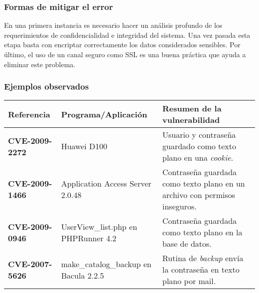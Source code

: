 \subsubsection{Formas de mitigar el error}

En una primera instancia es necesario hacer un análisis profundo de los requerimientos de confidencialidad e integridad del sistema.
Una vez pasada esta etapa basta con encriptar correctamente los datos considerados sensibles.
Por último, el uso de un canal seguro como SSL es una buena práctica que ayuda a eliminar este problema.

\subsubsection{Ejemplos observados}

\begin{tabular}[\baselineskip]{|p{1.75cm}|p{3.5cm}|p{8cm}|}
  \hline
  \textbf{Referencia} & Programa/Aplicación & Resumen de la vulnerabilidad \\
  \hline
  \textbf{CVE-2009-2272} & Huawei D100 & Usuario y contraseña guardado como texto plano en una \textit{cookie}. \\
  \hline
  \textbf{CVE-2009-1466} & Application Access Server 2.0.48 & Contraseña guardada como texto plano en un archivo con permisos inseguros.\\
  \hline
  \textbf{CVE-2009-0946} & UserView\_list.php en PHPRunner 4.2 & Contraseña guardada como texto plano en la base de datos. \\
  \hline
  \textbf{CVE-2007-5626} & make\_catalog\_backup en Bacula 2.2.5 & Rutina de \textit{backup} envía la contraseña en texto plano por mail. \\
  \hline
\end{tabular}
